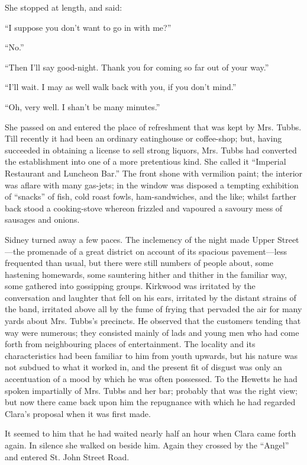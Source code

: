 She stopped at length, and said:

``I suppose you don't want to go in with me?''

``No.''

``Then I'll say good-night. Thank you for coming so far out of your
way.''

``I'll wait. I may as well walk back with you, if you don't mind.''

``Oh, very well. I shan't be many minutes.''

She passed on and entered the place of
{\protect\hypertarget{73}{}{}}refreshment that was kept by Mrs. Tubbs.
Till recently it had been an ordinary eatinghouse or coffee-shop; but,
having succeeded in obtaining a license to sell strong liquors, Mrs.
Tubbs had converted the establishment into one of a more pretentious
kind. She called it ``Imperial Restaurant and Luncheon Bar.'' The front
shone with vermilion paint; the interior was aflare with many gas-jets;
in the window was disposed a tempting exhibition of ``snacks'' of fish,
cold roast fowls, ham-sandwiches, and the like; whilst farther back
stood a cooking-stove whereon frizzled and vapoured a savoury mess of
sausages and onions.

Sidney turned away a few paces. The inclemency of the night made Upper
Street---the promenade of a great district on account of its spacious
pavement---less frequented than usual, but there were still numbers of
people about, some hastening homewards, some sauntering hither and
thither in the familiar way, some gathered into gossipping groups.
Kirkwood was irritated by the {\protect\hypertarget{74}{}{}}conversation
and laughter that fell on his ears, irritated by the distant strains of
the band, irritated above all by the fume of frying that pervaded the
air for many yards about Mrs. Tubbs's precincts. He observed that the
customers tending that way were numerous; they consisted mainly of lads
and young men who had come forth from neighbouring places of
entertainment. The locality and its characteristics had been familiar to
him from youth upwards, but his nature was not subdued to what it worked
in, and the present fit of disgust was only an accentuation of a mood by
which he was often possessed. To the Hewetts he had spoken impartially
of Mrs. Tubbs and her bar; probably that was the right view; but now
there came back upon him the repugnance with which he had regarded
Clara's proposal when it was first made.

It seemed to him that he had waited nearly half an hour when Clara came
forth again. In silence she walked on beside him. Again they crossed by
the ``Angel'' and entered St. John Street Road.


